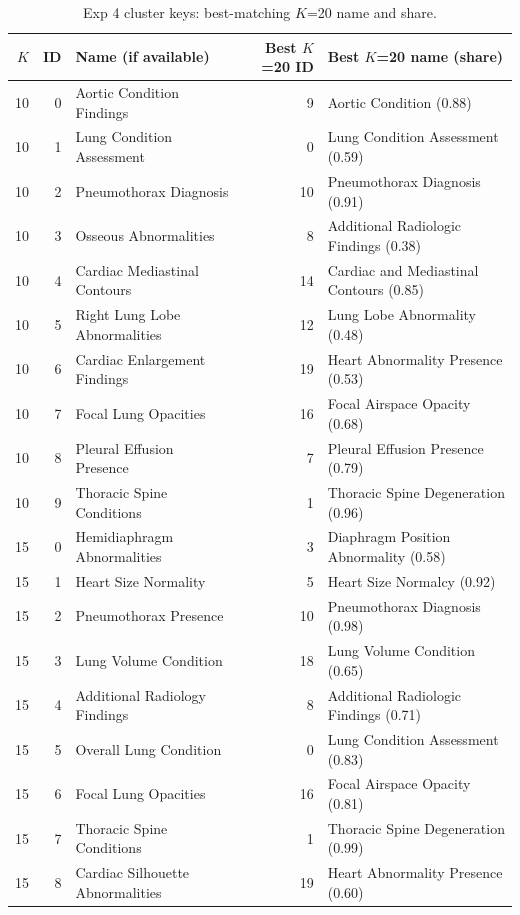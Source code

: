 \begin{table}[t]
\centering
\footnotesize
\caption{Exp 4 cluster keys: best-matching $K$=20 name and share.}
\label{tab:supp_exp4_keys}
\begin{tabular}{rrlrl}
\toprule
$K$ & ID & Name (if available) & Best $K$=20 ID & Best $K$=20 name (share) \\
\midrule
10 & 0 & Aortic Condition Findings & 9 & Aortic Condition (0.88) \\
10 & 1 & Lung Condition Assessment & 0 & Lung Condition Assessment (0.59) \\
10 & 2 & Pneumothorax Diagnosis & 10 & Pneumothorax Diagnosis (0.91) \\
10 & 3 & Osseous Abnormalities & 8 & Additional Radiologic Findings (0.38) \\
10 & 4 & Cardiac Mediastinal Contours & 14 & Cardiac and Mediastinal Contours (0.85) \\
10 & 5 & Right Lung Lobe Abnormalities & 12 & Lung Lobe Abnormality (0.48) \\
10 & 6 & Cardiac Enlargement Findings & 19 & Heart Abnormality Presence (0.53) \\
10 & 7 & Focal Lung Opacities & 16 & Focal Airspace Opacity (0.68) \\
10 & 8 & Pleural Effusion Presence & 7 & Pleural Effusion Presence (0.79) \\
10 & 9 & Thoracic Spine Conditions & 1 & Thoracic Spine Degeneration (0.96) \\
15 & 0 & Hemidiaphragm Abnormalities & 3 & Diaphragm Position Abnormality (0.58) \\
15 & 1 & Heart Size Normality & 5 & Heart Size Normalcy (0.92) \\
15 & 2 & Pneumothorax Presence & 10 & Pneumothorax Diagnosis (0.98) \\
15 & 3 & Lung Volume Condition & 18 & Lung Volume Condition (0.65) \\
15 & 4 & Additional Radiology Findings & 8 & Additional Radiologic Findings (0.71) \\
15 & 5 & Overall Lung Condition & 0 & Lung Condition Assessment (0.83) \\
15 & 6 & Focal Lung Opacities & 16 & Focal Airspace Opacity (0.81) \\
15 & 7 & Thoracic Spine Conditions & 1 & Thoracic Spine Degeneration (0.99) \\
15 & 8 & Cardiac Silhouette Abnormalities & 19 & Heart Abnormality Presence (0.60) \\

\end{tabular}
\end{table}
